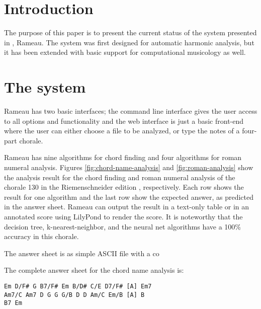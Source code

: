 \section{Introduction}

The purpose of this paper is to present the current status of the
system presented in \cite{kroger08:rameau}, Rameau. The system was
first designed for automatic harmonic analysis, but it has been
extended with basic support for computational musicology as well.


\cite{kroger08:musicologia}


\section{The system}
\label{sec:system}

Rameau has two basic interfaces; the command line interface gives the
user access to all options and functionality and the web interface is
just a basic front-end where the user can either choose a file to be
analyzed, or type the notes of a four-part chorale.

Rameau has nine algorithms for chord finding and four algorithms for
roman numeral analysis. Figures \ref{fig:chord-name-analysis} and
\ref{fig:roman-analysis} show the analysis result for the chord
finding and roman numeral analysis of the chorale 130 in the
Riemenschneider edition \cite{bach41:371} , respectively. Each row
shows the result for one algorithm and the last row show the expected
answer, as predicted  in the answer sheet.
Rameau can output the result in a text-only table or in an annotated
score using LilyPond \cite{nienhuys.ea08:LilyPond} to render the
score. It is noteworthy that the decision tree, k-nearest-neighbor,
and the neural net algorithms have a 100\% accuracy in this chorale.

The answer sheet is as simple ASCII file with a co 

The complete answer sheet for the chord name analysis is:

\begin{verbatim}
Em D/F# G B7/F# Em B/D# C/E D7/F# [A] Em7
Am7/C Am7 D G G G/B D D Am/C Em/B [A] B 
B7 Em
\end{verbatim}

